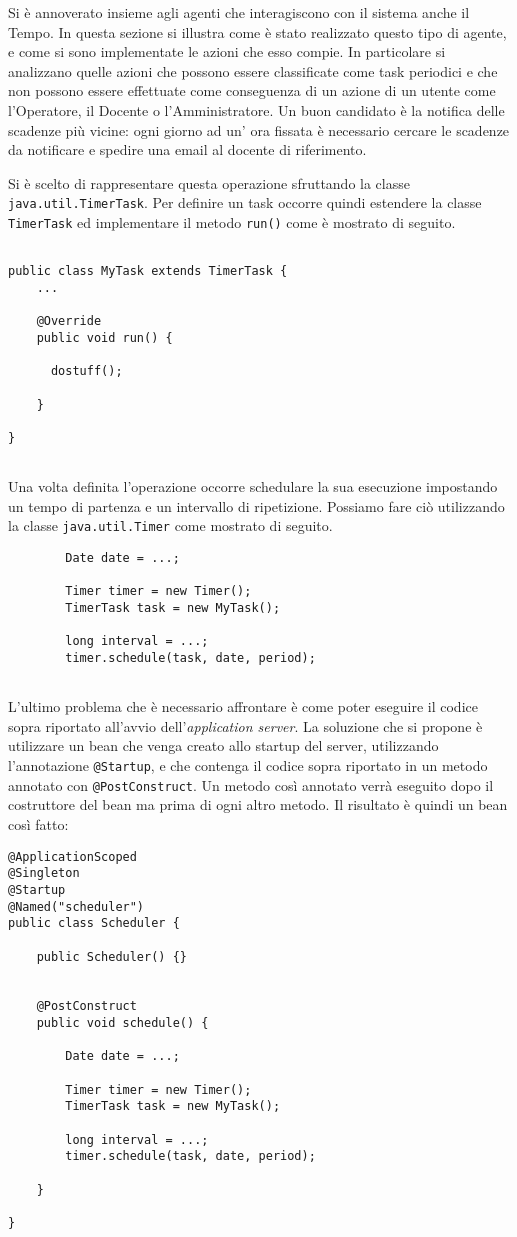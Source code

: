 Si è annoverato insieme agli agenti che interagiscono con il sistema anche il Tempo. In questa sezione si illustra come è stato realizzato questo tipo di agente, e come si sono implementate le azioni che esso compie.
In particolare si analizzano quelle azioni che possono essere classificate come task periodici e che non possono essere effettuate come conseguenza di un azione di un utente come l'Operatore, il Docente o l'Amministratore.
Un buon candidato è la notifica delle scadenze più vicine: ogni giorno ad un' ora fissata è necessario cercare le scadenze da notificare e spedire una email al docente di riferimento.

Si è scelto di rappresentare questa operazione sfruttando la classe \texttt{java.util.TimerTask}. Per definire un task occorre quindi estendere la classe \texttt{TimerTask} ed implementare il metodo \texttt{run()} come è mostrato di seguito.
\begin{lstlisting}
 
public class MyTask extends TimerTask {
	...

	@Override
	public void run() {
	
	  dostuff();

	}

}
 
\end{lstlisting}

Una volta definita l'operazione occorre schedulare la sua esecuzione impostando un tempo di partenza e un intervallo di ripetizione. Possiamo fare ciò utilizzando la classe \texttt{java.util.Timer} come mostrato di seguito.

\begin{lstlisting}
		Date date = ...;

		Timer timer = new Timer();
		TimerTask task = new MyTask();

		long interval = ...;
		timer.schedule(task, date, period);
 
\end{lstlisting}

L'ultimo problema che è necessario affrontare è come poter eseguire il codice sopra riportato all'avvio dell'\textit{application server}. La soluzione che si propone è utilizzare un bean che venga creato allo startup del server, utilizzando l'annotazione
 \texttt{@Startup}, e che contenga il codice sopra riportato in un metodo annotato con \texttt{@PostConstruct}. Un metodo così annotato verrà eseguito dopo il costruttore del bean ma prima di ogni altro metodo. Il risultato è quindi un bean così fatto:

\begin{lstlisting}
@ApplicationScoped
@Singleton
@Startup
@Named("scheduler")
public class Scheduler {

	public Scheduler() {}


	@PostConstruct
	public void schedule() {

		Date date = ...;

		Timer timer = new Timer();
		TimerTask task = new MyTask();

		long interval = ...;
		timer.schedule(task, date, period);

	}

}
\end{lstlisting}
